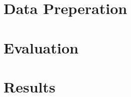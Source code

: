 \documentclass[final]{cvpr}
\begin{document}
\section{Data Preperation}

\section{Evaluation}

\section{Results}


{\small


}
\end{document}
